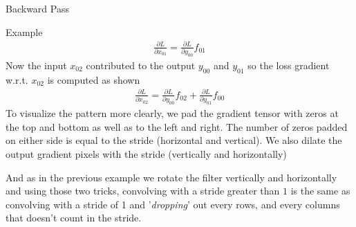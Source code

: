 \begin{parag}{Backward Pass}
\begin{subparag}{Example}
		\begin{align*} 
			\frac{\partial L}{\partial x_{01}} = \frac{\partial L}{\partial y_{00}} f_{01}
		\end{align*}
		Now the input $x_{02}$ contributed to the output $y_{00}$ and $y_{01}$ so the loss gradient w.r.t. $x_{02}$ is computed as shown 
		\begin{align*} 
			\frac{\partial L}{\partial x_{02}} = \frac{\partial L}{\partial y_{00}} f_{02} + \frac{\partial L}{\partial y_{01}}  f_{00}
		\end{align*}
		To visualize the pattern more clearly, we pad the gradient tensor with zeros at the top and bottom as well as to the left and right. The number of zeros padded on either side is equal to the stride (horizontal and vertical). We also dilate the output gradient pixels with the stride (vertically and horizontally)
	\end{subparag}
	And as in the previous example we rotate the filter vertically and horizontally and using those two tricks, convolving with a stride greater than $1$ is the same as convolving with a stride of 1 and '\textit{dropping}' out every rows, and every columns that doesn't count in the stride.
\end{parag}




